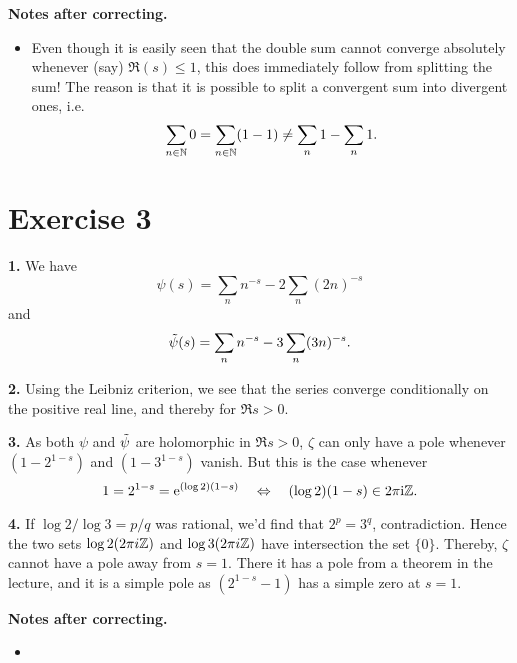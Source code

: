 \documentclass[a4paper,11pt]{article}
\begin{document}
\textbf{Notes after correcting.} \leavevmode
\begin{itemize}
    \item Even though it is easily seen that the double sum cannot converge
        absolutely whenever (say) $\Re(s) \leq 1$, this does immediately follow from splitting 
        the sum! The reason is that it is possible to split a convergent sum into divergent 
        ones, i.e.
        \[
            \sum_{n \in \mathbb{N}} 0 = \sum_{n \in \mathbb{N}} (1-1) \neq \sum_n 1 - \sum_n 1.
        \]
\end{itemize}

\section*{Exercise 3}
\textbf{1.} We have
\[
    \psi(s) = \sum_{n} n^{-s} - 2 \sum_n (2n)^{-s}
\]
and 
\[
    \Tilde \psi(s) = \sum_{n} n^{-s} - 3 \sum_n (3n)^{-s}.
\]

\textbf{2.} Using the Leibniz criterion, we see that the series converge conditionally on the
positive real line, and thereby for $\Re s > 0$. 

\textbf{3.} As both $\psi$ and $\Tilde \psi$ are holomorphic in $\Re s > 0$, $\zeta$ can only
have a pole whenever $(1-2^{1-s})$ and $(1-3^{1-s})$ vanish. But this is the case whenever 
\[
    1 = 2^{1-s} = \mathrm e^{(\log 2)(1-s)} \quad \Leftrightarrow \quad (\log 2)(1-s) \in 
    2 \pi \mathrm i \mathbb{Z}.
\]

\textbf{4.} If $\log 2 / \log 3 = p/q$ was rational, we'd find that $2^p = 3^q$, contradiction.
Hence the two sets $\log 2 (2 \pi i \mathbb{Z})$ and $\log 3 ( 2 \pi i \mathbb{Z})$ have intersection the set
$\{0\}$. Thereby, $\zeta$ cannot have a pole away from $s = 1$. There it has a pole from a 
theorem in the lecture, and it is a simple pole as $(2^{1-s}-1)$ has a simple zero at $s=1$. 



\textbf{Notes after correcting.} \leavevmode
\begin{itemize}
    \item 
\end{itemize}
\end{document}
